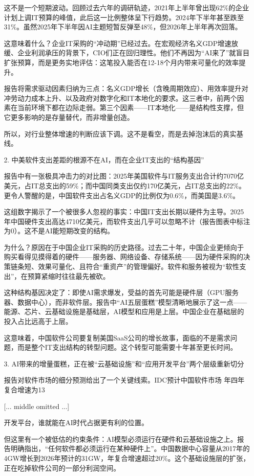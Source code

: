 \documentclass[11pt]{ctexart}
\begin{document}
这不是一个短期波动。回顾过去六年的调研轨迹，2021年上半年曾出现62\%的企业计划上调IT预算的峰值，此后这一比例整体呈下行趋势。2024年下半年甚至跌至31\%。虽然2025年下半年因AI主题短暂反弹至48\%，但2026年上半年再次回落。

这意味着什么？企业IT采购的“冲动期”已经过去。在宏观经济名义GDP增速放缓、企业利润承压的背景下，CIO们正在回归理性。他们不再因为“AI来了”就盲目扩张预算，而是更务实地评估：这笔投入能否在12-18个月内带来可量化的效率提升。

报告将需求驱动因素归纳为三点：名义GDP增长（含晚周期效应）、用效率提升对冲劳动力成本上升、以及政府对数字化和IT本地化的要求。这三者中，前两个因素在当前环境下都在边际走弱。第三个因素——IT本地化——是结构性支撑，但它更多影响的是存量替代，而非增量创造。

所以，对行业整体增速的判断应该下调。这不是看空，而是去掉泡沫后的真实基线。

2. 中美软件支出差距的根源不在AI，而在企业IT支出的“结构基因”

报告中有一张极具冲击力的对比图：2025年美国软件与IT服务支出合计约7070亿美元，占IT总支出的59\%；而中国同类支出仅约170亿美元，占IT总支出的22\%。更令人警醒的是，中国软件支出占名义GDP的比例仅为0.6\%，而美国是3.6\%。

这组数字揭示了一个被很多人忽视的事实：中国IT支出长期以硬件为主导。2025年中国硬件支出高达4710亿美元，而软件支出几乎可以忽略不计（报告图表中标注为0）。这不是AI能短期改变的结构。

为什么？原因在于中国企业IT采购的历史路径。过去二十年，中国企业更倾向于购买看得见摸得着的硬件——服务器、网络设备、存储系统——因为硬件采购的决策链条短、效果可量化、且符合“重资产”的管理偏好。软件和服务被视为“软性支出”，在预算紧缩时往往最先被砍。

这种结构基因决定了：即使AI需求爆发，受益的首先可能是硬件层（GPU服务器、数据中心），而非软件层。报告中“AI五层蛋糕”模型清晰地展示了这一点——能源、芯片、云基础设施是基础层，AI模型和应用是上层。中国企业在基础层的投入占比远高于上层。

这意味着，中国软件公司要复制美国SaaS公司的增长故事，面临的不是需求问题，而是整个IT支出结构的转型问题。这个转型可能需要十年甚至更长时间。

3. AI带来的增量蛋糕，正在被“云基础设施”和“应用开发平台”两个层级重新切分

报告对软件市场的细分预测给出了一个关键线索。IDC预计中国软件市场 年四年复合增速为13

[... middle omitted ...]

开发平台，谁就能在AI时代占据更有利的位置。

但这里有一个被低估的约束条件：AI模型必须运行在硬件和云基础设施之上。报告明确指出，“任何软件都必须运行在某种硬件上”。中国数据中心容量从2017年的4GW增长到2026年预计的31GW，年复合增速超过20\%。这个基础设施层的扩张，正在吃掉软件公司的一部分利润空间。
\end{document}
